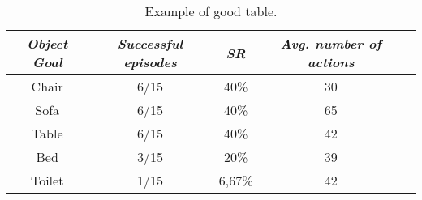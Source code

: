 \begin{table}[t]
    \centering
    \begin{tabular}{c|cccc}
        \toprule
        \textit{\textbf{Object Goal}} & \textit{\textbf{Successful episodes}} & \textit{\textbf{SR}} & \textit{\textbf{Avg. number of actions}} \\ \midrule
        Chair                         & 6/15                                  & 40\%                 & 30                                       \\
        Sofa                          & 6/15                                  & 40\%                 & 65                                       \\
        Table                         & 6/15                                  & 40\%                 & 42                                       \\
        Bed                           & 3/15                                  & 20\%                 & 39                                       \\
        Toilet                        & 1/15                                  & 6,67\%               & 42                                       \\ \bottomrule
    \end{tabular}
    \caption{Example of good table.}
    \label{tab:vlv}
\end{table}